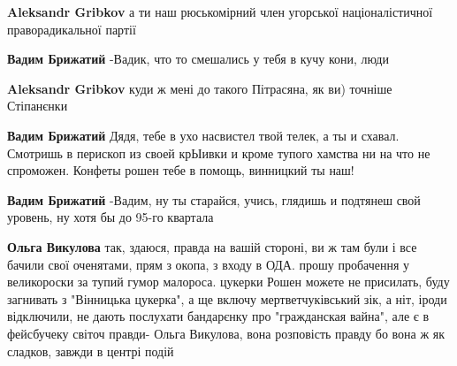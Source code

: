 \begin{itemize}
\begin{itemize}
\textbf{Aleksandr Gribkov} а ти наш рюськомірний член угорської націоналістичної праворадикальної партії

 
\textbf{Вадим Брижатий} -Вадик, что то смешались у тебя в кучу кони, люди\Laughey[1.0][white]

 
\textbf{Aleksandr Gribkov} куди ж мені до такого Пітрасяна, як ви) точніше Стіпанєнки

 
\textbf{Вадим Брижатий} Дядя, тебе в ухо насвистел твой телек, а ты и схавал. Смотришь в перископ из своей крЫивки и кроме тупого хамства ни на что не спроможен. Конфеты рошен тебе в помощь, винницкий ты наш!

 
\textbf{Вадим Брижатий} -Вадим, ну ты старайся, учись, глядишь и подтянеш свой уровень, ну хотя бы до 95-го квартала\Laughey[1.0][white]

 
\textbf{Ольга Викулова} так, здаюся, правда на вашій стороні, ви ж там були і все бачили свої оченятами, прям з окопа, з входу в ОДА. прошу пробачення у великороски за тупий гумор малороса. цукерки Рошен можете не присилать, буду загнивать з "Вінницька цукерка", а ще включу мертветчуківський зік, а ніт, іроди відключили, не дають послухати бандарєнку про "гражданская вайна", але є в фейсбучеку світоч правди- Ольга Викулова, вона розповість правду бо вона ж як сладков, завжди в центрі подій


\end{itemize}
\end{itemize}
